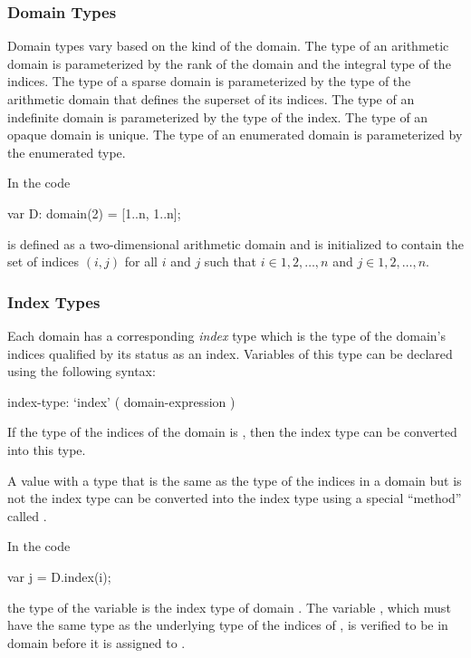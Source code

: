 \subsubsection{Domain Types}
\label{Domain_Types}

Domain types vary based on the kind of the domain.  The type of an
arithmetic domain is parameterized by the rank of the domain and the
integral type of the indices.  The type of a sparse domain is
parameterized by the type of the arithmetic domain that defines the
superset of its indices.  The type of an indefinite domain is
parameterized by the type of the index.  The type of an opaque domain
is unique.  The type of an enumerated domain is parameterized by the
enumerated type.

\begin{example}
In the code
\begin{chapel}
var D: domain(2) = [1..n, 1..n];
\end{chapel}
 is defined as a two-dimensional arithmetic domain and is
initialized to contain the set of indices $(i,j)$ for all $i$ and $j$
such that $i \in {1, 2, \ldots, n}$ and $j \in {1, 2, \ldots, n}$.
\end{example}

\subsubsection{Index Types}
\label{Index_Types}

Each domain has a corresponding {\em index} type which is the type of
the domain's indices qualified by its status as an index.  Variables
of this type can be declared using the following syntax:
\begin{syntax}
index-type:
  `index' ( domain-expression )
\end{syntax}
If the type of the indices of the domain is , then the index
type can be converted into this type.

A value with a type that is the same as the type of the indices in a
domain but is not the index type can be converted into the index type
using a special ``method'' called .

\begin{example}
In the code
\begin{chapel}
var j = D.index(i);
\end{chapel}
the type of the variable  is the index type of
domain .  The variable , which must have the same type
as the underlying type of the indices of , is verified to be
in domain  before it is assigned to .
\end{example}

